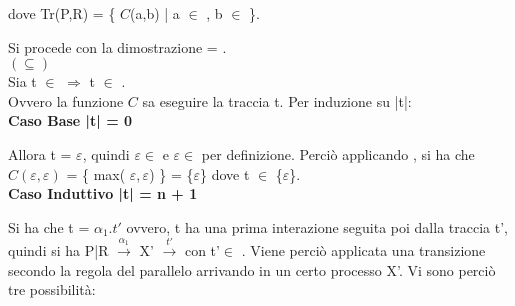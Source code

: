 dove Tr(P,R) = \{ $C$(a,b) | a $\in$ , b $\in$ \}.

Si procede con la dimostrazione  = .\\

$(\subseteq)$ 
\\

Sia t $\in$   $\Rightarrow$  t $\in$ .\\
Ovvero la funzione $C$ sa eseguire la traccia t.
Per induzione su |t|:\\

\textbf{Caso Base |t| = 0}

Allora t = $\varepsilon$, quindi $\varepsilon \in$  e $\varepsilon \in$  per definizione. Perciò applicando , si ha che $C(\varepsilon, \varepsilon)$ = \{ max( $\varepsilon, \varepsilon$)  \} = \{$\varepsilon$\} dove t $\in$ \{$\varepsilon$\}.\\

\textbf{Caso Induttivo |t| = n + 1}

Si ha che t = $\alpha_{1}.t'$ ovvero, t ha una prima interazione seguita poi dalla traccia t', quindi si ha P|R $ \overset{\alpha_{1}}\rightarrow $ X' $\overset{t'}\rightarrow$ con t'$\in$ . Viene perciò applicata una transizione secondo la regola del parallelo arrivando in un certo processo X'. Vi sono perciò tre possibilità:

